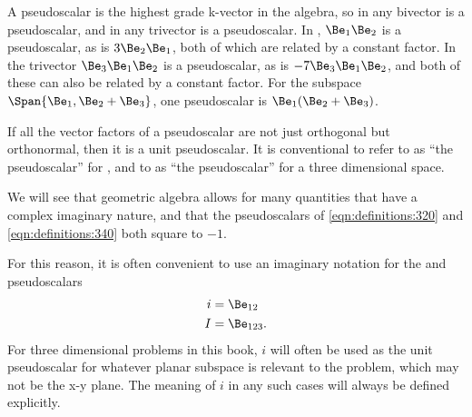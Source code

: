 
A pseudoscalar is the highest grade k-vector in the algebra, so in
 any bivector is a pseudoscalar, and in  any trivector is a pseudoscalar.
In , \( \Be_1 \Be_2 \) is a pseudoscalar, as is \( 3 \Be_2 \Be_1 \), both of which are related by a constant factor.
In  the trivector \( \Be_3 \Be_1 \Be_2 \) is a pseudoscalar, as is \( - 7 \Be_3 \Be_1 \Be_2 \), and both of these can also be related by a constant factor.
For the subspace \( \Span{ \Be_1, \Be_2 + \Be_3} \), one pseudoscalar is \( \Be_1(\Be_2 + \Be_3) \).

If all the vector factors of a pseudoscalar are not just orthogonal but orthonormal, then it is a unit pseudoscalar.
It is conventional to refer to
as ``the pseudoscalar'' for , and to
as ``the pseudoscalar'' for a three dimensional space.

We will see that geometric algebra allows for many quantities that have a complex imaginary nature, and that the pseudoscalars of \cref{eqn:definitions:320} and \cref{eqn:definitions:340} both square to \(-1\).

For this reason, it is often convenient to use an imaginary notation for the  and  pseudoscalars
\begin{equation}\label{eqn:multivector_nomenclature:42}
\begin{aligned}
i &= \Be_{12} \\
I &= \Be_{123}.
\end{aligned}
\end{equation}
For three dimensional problems in this book, \( i \) will often be used as the unit pseudoscalar for whatever planar subspace is relevant to the problem, which may not be the x-y plane.
The meaning of \( i \) in any such cases will always be defined explicitly.

